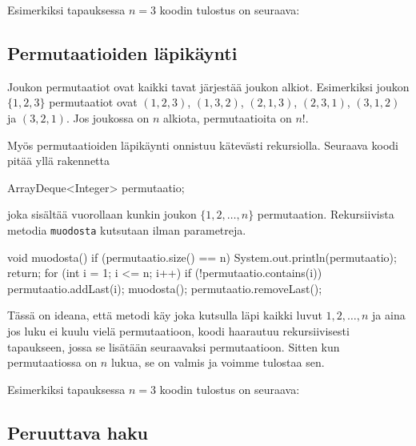 Esimerkiksi tapauksessa $n=3$ koodin tulostus on seuraava:

\begin{code}
[]
[3]
[2]
[2, 3]
[1]
[1, 3]
[1, 2]
[1, 2, 3]
\end{code}

\subsection{Permutaatioiden läpikäynti}

Joukon permutaatiot ovat kaikki tavat järjestää joukon alkiot.
Esimerkiksi joukon $\{1,2,3\}$ permutaatiot ovat
$(1,2,3)$, $(1,3,2)$, $(2,1,3)$, $(2,3,1)$, $(3,1,2)$ ja $(3,2,1)$.
Jos joukossa on $n$ alkiota, permutaatioita on $n!$.

Myös permutaatioiden läpikäynti onnistuu kätevästi rekursiolla.
Seuraava koodi pitää yllä rakennetta

\begin{code}
ArrayDeque<Integer> permutaatio;
\end{code}

joka sisältää vuorollaan kunkin joukon $\{1,2,\dots,n\}$ permutaation.
Rekursiivista metodia \texttt{muodosta} kutsutaan ilman parametreja.

\begin{code}
void muodosta() {
    if (permutaatio.size() == n) {
        System.out.println(permutaatio);
        return;
    }
    for (int i = 1; i <= n; i++) {
        if (!permutaatio.contains(i)) {
            permutaatio.addLast(i);
            muodosta();
            permutaatio.removeLast();
        }
    }
}
\end{code}

Tässä on ideana, että metodi käy joka kutsulla läpi kaikki luvut
$1,2,\dots,n$ ja aina jos luku ei kuulu vielä permutaatioon,
koodi haarautuu rekursiivisesti tapaukseen, jossa se lisätään
seuraavaksi permutaatioon.
Sitten kun permutaatiossa on $n$ lukua, se on valmis ja
voimme tulostaa sen.

Esimerkiksi tapauksessa $n=3$ koodin tulostus on seuraava:

\begin{code}
[1, 2, 3]
[1, 3, 2]
[2, 1, 3]
[2, 3, 1]
[3, 1, 2]
[3, 2, 1]
\end{code}

\subsection{Peruuttava haku}

